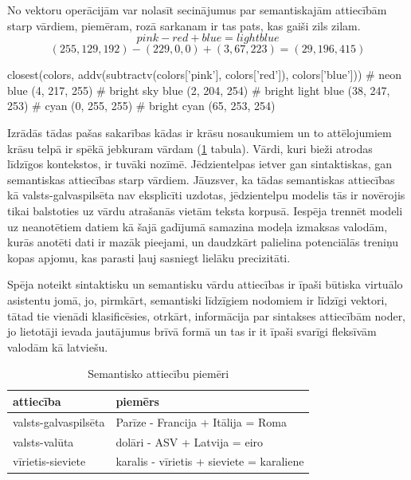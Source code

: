 No vektoru operācijām var nolasīt secinājumus par semantiskajām attiecībām starp vārdiem, piemēram, rozā sarkanam ir tas pats, kas gaiši zils zilam.
$$pink - red + blue = light blue$$
$$(255, 129, 192) - (229, 0, 0) + (3, 67, 223) = (29, 196, 415)$$
\begin{python}
closest(colors, addv(subtractv(colors['pink'], colors['red']), colors['blue']))
# neon blue (4, 217, 255)
# bright sky blue (2, 204, 254)
# bright light blue (38, 247, 253)
# cyan (0, 255, 255)
# bright cyan (65, 253, 254)
\end{python}


Izrādās tādas pašas sakarības kādas ir krāsu nosaukumiem un to attēlojumiem krāsu telpā ir spēkā jebkuram vārdam (\ref{tab:semantic-relationship-examples} tabula). Vārdi, kuri bieži atrodas līdzīgos kontekstos, ir tuvāki nozīmē. Jēdzientelpas ietver gan sintaktiskas, gan semantiskas attiecības starp vārdiem. Jāuzsver, ka tādas semantiskas attiecības kā valsts-galvaspilsēta nav eksplicīti uzdotas, jēdzientelpu modelis tās ir novērojis tikai balstoties uz vārdu atrašanās vietām teksta korpusā. Iespēja trennēt modeli uz neanotētiem datiem kā šajā gadījumā samazina modeļa izmaksas valodām, kurās anotēti dati ir mazāk pieejami, un daudzkārt palielina potenciālās treniņu kopas apjomu, kas parasti ļauj sasniegt lielāku precizitāti.


Spēja noteikt sintaktisku un semantisku vārdu attiecības ir īpaši būtiska virtuālo asistentu jomā, jo, pirmkārt, semantiski līdzīgiem nodomiem ir līdzīgi vektori, tātad tie vienādi klasificēsies, otrkārt, informācija par sintakses attiecībām noder, jo lietotāji ievada jautājumus brīvā formā un tas ir it īpaši svarīgi fleksīvām valodām kā latviešu.



\begin{table}[htbp]
	\centering
	\caption{Semantisko attiecību piemēri}
	\begin{tabular}{ll}\toprule
		attiecība & piemērs  \\\midrule
		valsts-galvaspilsēta   & Parīze - Francija + Itālija = Roma \\
		valsts-valūta   & dolāri - ASV + Latvija = eiro \\
		vīrietis-sieviete   & karalis - vīrietis + sieviete = karaliene \\\bottomrule
	\end{tabular}%
	\label{tab:semantic-relationship-examples}%
\end{table}

